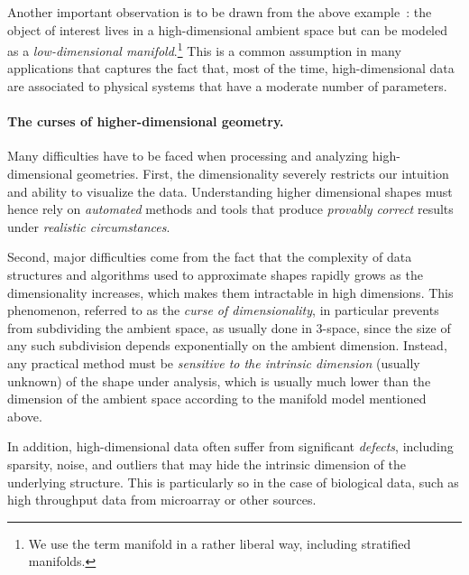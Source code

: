 Another important observation is to be drawn from the above example~: the object of interest lives in a high-dimensional ambient space but can be modeled as a {\em low-dimensional manifold}.\footnote{We use the term manifold in a rather liberal way, including stratified manifolds.} This is a common assumption  in many applications  that captures the fact that, most of the time, high-dimensional data are associated to physical systems that have a moderate number of  parameters.

\paragraph{The curses of higher-dimensional geometry.} 
Many difficulties have to be faced when processing and analyzing
high-dimensional geometries. First, the dimensionality severely restricts our intuition and ability to visualize the data.  Understanding higher dimensional shapes must hence rely on {\em automated} methods and tools that produce {\em provably correct} results under {\em realistic circumstances}.

Second, major difficulties come from the fact that the complexity of data structures and algorithms used to approximate shapes rapidly grows as the dimensionality increases, which makes them intractable in high dimensions.  This phenomenon, referred to as the {\em curse of dimensionality}, in particular prevents from subdividing the ambient space, as usually done in 3-space, since the size of any such subdivision depends exponentially on the ambient dimension. Instead, any practical method must be {\em sensitive to the intrinsic dimension} (usually unknown) of the shape under analysis, which is usually much lower than the dimension of the ambient space according to the manifold model mentioned above.

In addition, high-dimensional data often suffer from significant {\em defects}, including sparsity, noise, and outliers that may hide the intrinsic dimension of the underlying structure. This is particularly so in the case of biological data, such as high throughput data from microarray or other sources. %

